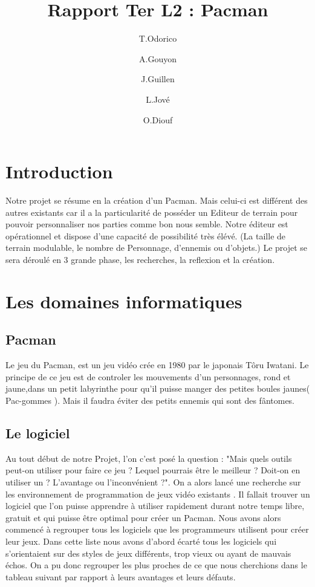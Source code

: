 \documentclass[12pt,a4paper,article]{article} %
\title{Rapport Ter L2 :  Pacman}
\author{T.Odorico \and A.Gouyon \and J.Guillen \and L.Jové \and O.Diouf}
\begin{document}
\maketitle
\pagebreak

\tableofcontents


\pagebreak

\section{Introduction}


Notre projet se résume en la création d'un Pacman. Mais celui-ci est différent des autres existants car il a la particularité de posséder un Editeur de terrain pour pouvoir personnaliser nos parties comme bon nous semble. Notre éditeur est opérationnel et dispose d'une capacité de possibilité très élévé. (La taille de terrain modulable, le nombre de Personnage, d'ennemis ou d'objets.) Le projet se sera déroulé en 3 grande phase, les recherches, la reflexion et la création.

\section{Les domaines informatiques }

\subsection{Pacman}


Le jeu du Pacman, est un jeu vidéo crée en 1980 par le japonais Tôru Iwatani. Le principe de ce jeu est de controler les mouvements d'un personnages, rond et jaune,dans un petit labyrinthe pour qu'il puisse manger des petites boules jaunes( Pac-gommes ). Mais il faudra éviter des petits ennemis qui sont des fântomes.

\subsection{Le logiciel }


Au tout début de notre Projet, l'on c'est posé la question : "Mais quels outils peut-on utiliser pour faire ce jeu ? Lequel pourrais être le meilleur ? Doit-on en utiliser un ? L'avantage ou l'inconvénient ?". On a alors lanc\'e une recherche sur les environnement de programmation de  jeux vidéo existants . Il fallait trouver un logiciel que l'on puisse apprendre à utiliser rapidement durant notre temps libre, gratuit et qui puisse être optimal pour créer un Pacman. Nous avons alors commenc\'e à regrouper tous les logiciels que les programmeurs utilisent pour créer leur jeux. Dans cette liste nous avons d'abord écarté tous les logiciels qui s'orientaient sur des styles de jeux différents, trop vieux ou ayant de mauvais échos. On a pu donc regrouper les plus proches de ce que nous cherchions dans le tableau suivant par rapport à leurs avantages et leurs défauts. \\
\end{document}
